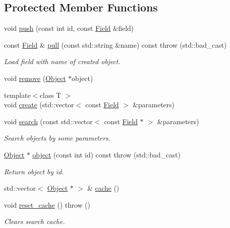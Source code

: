 \subsection*{Protected Member Functions}
\begin{DoxyCompactItemize}
\item 
void \hyperlink{classCore_1_1AbstractUI_a2744c5f015639a849c3f76dd7cc2656a}{push} (const int id, const \hyperlink{classCore_1_1Field}{Field} \&field)
\item 
const \hyperlink{classCore_1_1Field}{Field} \& \hyperlink{classCore_1_1AbstractUI_a2f70b789e482b7cf8a8b8574d29dc07b}{pull} (const std::string \&name) const   throw (std::bad\_\-cast)
\begin{DoxyCompactList}\small\item\em Load field with {\itshape name\/} of created object. \item\end{DoxyCompactList}\item 
void \hyperlink{classCore_1_1AbstractUI_abfdd0df1f1b2eeeab68536fa45d06c79}{remove} (\hyperlink{classCore_1_1Object}{Object} $\ast$object)
\item 
{\footnotesize template$<$class T $>$ }\\void \hyperlink{classCore_1_1AbstractUI_ac49885c7a9e25368e15172057f05d6a9}{create} (std::vector$<$ const \hyperlink{classCore_1_1Field}{Field} $>$ \&parameters)
\item 
void \hyperlink{classCore_1_1AbstractUI_aeffc2f4b846f5df74016a5bbed4f5549}{search} (const std::vector$<$ const \hyperlink{classCore_1_1Field}{Field} $\ast$ $>$ \&parameters)
\begin{DoxyCompactList}\small\item\em Search objects by some parameters. \item\end{DoxyCompactList}\item 
\hyperlink{classCore_1_1Object}{Object} $\ast$ \hyperlink{classCore_1_1AbstractUI_aa362757c2e56131d494986f34d31a5ad}{object} (const int id) const   throw (std::bad\_\-cast)
\begin{DoxyCompactList}\small\item\em Return object by id. \item\end{DoxyCompactList}\item 
std::vector$<$ \hyperlink{classCore_1_1Object}{Object} $\ast$ $>$ \& \hyperlink{classCore_1_1AbstractUI_afb9ec6d8636888b77cfcdc37713d5abc}{cache} ()
\item 
void \hyperlink{classCore_1_1AbstractUI_ade9be0dbb4b274ed6ef4d0d427152916}{reset\_\-cache} ()  throw ()
\begin{DoxyCompactList}\small\item\em Clears search cache. \item\end{DoxyCompactList}\end{DoxyCompactItemize}

